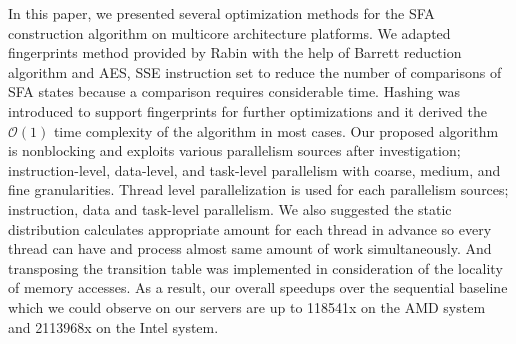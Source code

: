 \documentclass[10pt, conference, compsocconf]{IEEEtran}
\begin{document}
In this paper, we presented several optimization methods for 
the SFA construction algorithm on multicore architecture platforms.
We adapted fingerprints method provided by Rabin with the help of Barrett
reduction algorithm and AES, SSE instruction set to reduce the number of comparisons of
SFA states because a comparison requires considerable time.
Hashing was introduced to support fingerprints for further
optimizations and it derived the $\mathcal{O}(1)$ time complexity of the algorithm in most 
cases. Our proposed algorithm is nonblocking and exploits various
parallelism sources after investigation; instruction-level, data-level, and task-level
parallelism with coarse, medium, and fine granularities. Thread level parallelization is used for each parallelism sources; instruction, data and task-level parallelism.
We also suggested the static distribution calculates appropriate amount for each thread in advance so every thread
can have and process almost same amount of work simultaneously. 
And transposing the transition table was implemented in consideration of the locality of memory accesses.
As a result, our overall speedups over the sequential baseline which we could observe on our servers are up to 118541x on the AMD system and 2113968x on the Intel system.

















\end{document}
